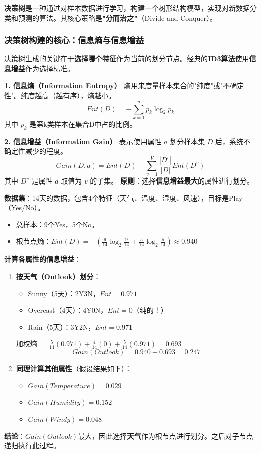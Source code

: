 \begin{conceptbox}
\textbf{决策树}是一种通过对样本数据进行学习，构建一个树形结构模型，实现对新数据分类和预测的算法。其核心策略是\textbf{"分而治之"}（Divide and Conquer）。
\end{conceptbox}

\subsubsection{决策树构建的核心：信息熵与信息增益}

决策树生成的关键在于\textbf{选择哪个特征}作为当前的划分节点。经典的\textbf{ID3算法}使用\textbf{信息增益}作为选择标准。

\textbf{1. 信息熵（Information Entropy）}
熵用来度量样本集合的"纯度"或"不确定性"。纯度越高（越有序），熵越小。
$$Ent(D) = - \sum_{k=1}^{n} p_k \log_2 p_k$$
其中 $p_k$ 是第k类样本在集合D中占的比例。

\textbf{2. 信息增益（Information Gain）}
表示使用属性 $a$ 划分样本集 $D$ 后，系统不确定性减少的程度。
$$Gain(D, a) = Ent(D) - \sum_{v=1}^{V} \frac{|D^v|}{|D|} Ent(D^v)$$
其中 $D^v$ 是属性 $a$ 取值为 $v$ 的子集。
\textbf{原则}：选择\textbf{信息增益最大}的属性进行划分。

\begin{examplebox}
\textbf{数据集}：14天的数据，包含4个特征（天气、温度、湿度、风速），目标是Play（Yes/No）。
\begin{itemize}[itemsep=0pt]
    \item 总样本：9个Yes，5个No。
    \item 根节点熵：$Ent(D) = -(\frac{9}{14}\log_2\frac{9}{14} + \frac{5}{14}\log_2\frac{5}{14}) \approx 0.940$
\end{itemize}

\textbf{计算各属性的信息增益}：
\begin{enumerate}[itemsep=0pt]
    \item \textbf{按天气（Outlook）划分}：
    \begin{itemize}
        \item Sunny（5天）：2Y3N，$Ent=0.971$
        \item Overcast（4天）：4Y0N，$Ent=0$（纯的！）
        \item Rain（5天）：3Y2N，$Ent=0.971$
    \end{itemize}
    加权熵 $= \frac{5}{14}(0.971) + \frac{4}{14}(0) + \frac{5}{14}(0.971) = 0.693$
    $$Gain(Outlook) = 0.940 - 0.693 = 0.247$$
    
    \item \textbf{同理计算其他属性}（假设结果如下）：
    \begin{itemize}
        \item $Gain(Temperature) = 0.029$
        \item $Gain(Humidity) = 0.152$
        \item $Gain(Windy) = 0.048$
    \end{itemize}
\end{enumerate}

\textbf{结论}：$Gain(Outlook)$最大，因此选择\textbf{天气}作为根节点进行划分。之后对子节点递归执行此过程。
\end{examplebox}

